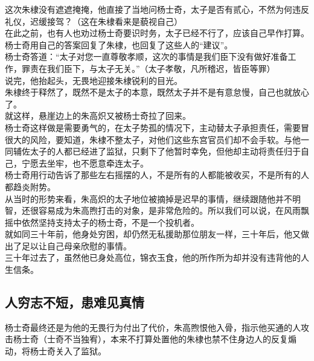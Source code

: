 \begin{multicols}{\theparacolNo}
这次朱棣没有遮遮掩掩，他直接了当地问杨士奇，太子是否有贰心，不然为何违反礼仪，迟缓接驾？（这在朱棣看来是藐视自己）\\

在此之前，也有人也劝过杨士奇要识时务，太子已经不行了，应该自己早作打算。\\

杨士奇用自己的答案回复了朱棣，也回复了这些人的“建议”。\\

杨士奇答道：“太子对您一直尊敬孝顺，这次的事情是我们臣下没有做好准备工作，罪责在我们臣下，与太子无关。”（太子孝敬，凡所稽迟，皆臣等罪）\\

说完，他抬起头，无畏地迎接朱棣锐利的目光。\\

朱棣终于释然了，既然不是太子的本意，既然太子并不是有意怠慢，自己也就放心了。\\

就这样，悬崖边上的朱高炽又被杨士奇拉了回来。\\

杨士奇这样做是需要勇气的，在太子势孤的情况下，主动替太子承担责任，需要冒很大的风险，要知道，朱棣不整太子，对他们这些东宫官员们却不会手软。与他一同辅佐太子的人都已经进了监狱，只剩下了他暂时幸免，但他却主动将责任归于自己，宁愿去坐牢，也不愿意牵连太子。\\

杨士奇用行动告诉了那些左右摇摆的人，不是所有的人都能被收买，不是所有的人都趋炎附势。\\

从当时的形势来看，朱高炽的太子地位被摘掉是迟早的事情，继续跟随他并不明智，还很容易成为朱高煦打击的对象，是非常危险的。所以我们可以说，在风雨飘摇中依然坚持支持太子的杨士奇，不是一个投机者。\\

就如同三十年前，他身处穷困，却仍然无私援助那位朋友一样，三十年后，他又做出了足以让自己母亲欣慰的事情。\\

三十年过去了，虽然他已身处高位，锦衣玉食，他的所作所为却并没有违背他的人生信条。\\

\subsection{人穷志不短，患难见真情}
杨士奇最终还是为他的无畏行为付出了代价，朱高煦恨他入骨，指示他买通的人攻击杨士奇（士奇不当独宥），本来不打算处置他的朱棣也禁不住身边人的反复煽动，将杨士奇关入了监狱。\\


\end{multicols}
